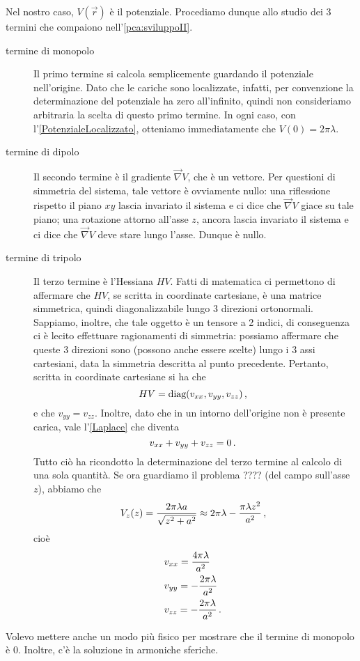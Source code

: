 \documentclass[../main.tex]{subfiles}
\begin{document}
Nel nostro caso, $V(\vec{r})$ è il potenziale. Procediamo dunque allo studio dei 3 termini che compaiono nell'\cref{pca:sviluppoII}.
\begin{description}
	\item [termine di monopolo] Il primo termine si calcola semplicemente guardando il potenziale nell'origine. Dato che le cariche sono localizzate, infatti, per convenzione la determinazione del potenziale ha zero all'infinito, quindi non consideriamo arbitraria la scelta di questo primo termine. In ogni caso, con l'\cref{PotenzialeLocalizzato}, otteniamo immediatamente che $V(0)=2\pi\lambda$.
	\item [termine di dipolo] Il secondo termine è il gradiente $\vec{\nabla}V$, che è un vettore. Per questioni di simmetria del sistema, tale vettore è ovviamente nullo: una riflessione rispetto il piano $xy$ lascia invariato il sistema e ci dice che $\vec{\nabla}V$ giace su tale piano; una rotazione attorno all'asse $z$, ancora lascia invariato il sistema e ci dice che $\vec{\nabla}V$ deve stare lungo l'asse. Dunque è nullo.
	\item [termine di tripolo] Il terzo termine è l'Hessiana $H V$. Fatti di matematica ci permettono di affermare che $H V$, se scritta in coordinate cartesiane, è una matrice simmetrica, quindi diagonalizzabile lungo 3 direzioni ortonormali. Sappiamo, inoltre, che tale oggetto è un tensore a 2 indici, di conseguenza ci è lecito effettuare ragionamenti di simmetria: possiamo affermare che queste 3 direzioni sono (possono anche essere scelte) lungo i 3 assi cartesiani, data la simmetria descritta al punto precedente. Pertanto, scritta in coordinate cartesiane si ha che
	\[
		H V = \text{diag}(v_{xx},v_{yy},v_{zz})\, \text{, }
	\]
	e che $v_{yy}=v_{zz}$. Inoltre, dato che in un intorno dell'origine non è presente carica, vale l'\cref{Laplace} che diventa
	\[
		v_{xx}+v_{yy}+v_{zz}=0\, \text{. }
	\]
	Tutto ciò ha ricondotto la determinazione del terzo termine al calcolo di una sola quantità. Se ora guardiamo il problema ???? (del campo sull'asse $z$), abbiamo che
	\[
		V_z(z)=\frac{2\pi\lambda a}{\sqrt{z^2+a^2}} \approx 2 \pi \lambda - \frac{\pi \lambda z^2}{a^2}\, \text{, }
	\]
	cioè
	\begin{align*}
		&v_{xx}= \frac{4\pi\lambda}{a^2}\\
		&v_{yy}= -\frac{2\pi\lambda}{a^2}\\
		&v_{zz}= -\frac{2\pi\lambda}{a^2}\, \text{. }
	\end{align*}
\end{description}

\begin{remark}
	Volevo mettere anche un modo più fisico per mostrare che il termine di monopolo è 0. Inoltre, c'è la soluzione in armoniche sferiche.
\end{remark}
\end{document}
